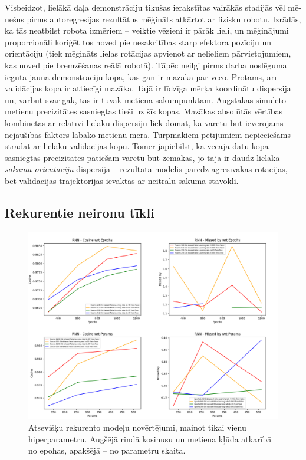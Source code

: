 \documentclass[12pt, a4paper]{article}
\numberwithin{equation}{section} %
\begin{document}
Visbeidzot, lielākā daļa demonstrāciju tikušas ierakstītas vairākās stadijās vēl mē-nešus pirms autoregresijas rezultātus mēģināts atkārtot ar fizisku robotu. Izrādās, ka tās neatbilst robota izmēriem -- veiktie vēzieni ir pārāk lieli, un mēģinājumi proporcionāli koriģēt tos noved pie nesakritības starp efektora pozīciju un orientāciju (tiek mēģināts lielas rotācijas apvienot ar nelieliem pārvietojumiem, kas noved pie bremzēšanas reālā robotā). Tāpēc neilgi pirms darba noslēguma iegūta jauna demonstrāciju kopa, kas gan ir mazāka par veco. Protams, arī validācijas kopa ir attiecīgi mazāka.  Tajā ir līdzīga mērķa koordinātu dispersija un, varbūt svarīgāk, tās ir tuvāk metiena sākumpunktam. Augstākās simulēto metienu precizitātes sasniegtas tieši uz šīs kopas. Mazākas absolūtās vērtības kombinētas ar relatīvi lielāku dispersiju liek domāt, ka varētu būt ievērojams nejaušības faktors labāko metienu mērā. Turpmākiem pētījumiem nepieciešams strādāt ar lielāku validācijas kopu. Tomēr jāpiebilst, ka vecajā datu kopā sasniegtās precizitātes patiešām varētu būt zemākas, jo tajā ir daudz lielāka \textit{sākuma orientāciju} dispersija -- rezultātā modelis paredz agresīvākas rotācijas, bet validācijas trajektorijas ievāktas ar neitrālu sākuma stāvokli.

\subsection{Rekurentie neironu tīkli}

\begin{figure}[t!]
    \centering
    \includegraphics[width=16cm,page=1]{../img/rnn-independent-params-epoch.png}
    \caption{Atsevišķu rekurento modeļu novērtējumi, mainot tikai vienu hiperparametru. Augšējā rindā kosinusu un metiena kļūda atkarībā no epohas, apakšējā -- no parametru skaita.}
\end{figure}
\end{document}
